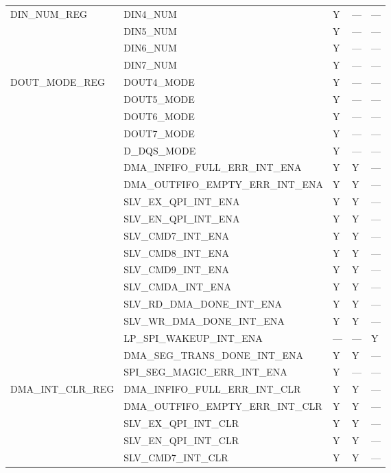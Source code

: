\documentclass[main\_\_CN.tex]{subfiles}
\begin{document}
\begin{longtable}{|p{4.0cm}|p{6.0cm}|p{1.5cm}|p{1.5cm}|p{1.5cm}|}
\multirow{4}{*}{DIN\_NUM\_REG} & DIN4\_NUM & Y & --- & --- \\ \cline{2-5}
& DIN5\_NUM & Y & --- & --- \\ \cline{2-5}
& DIN6\_NUM & Y & --- & --- \\ \cline{2-5}
& DIN7\_NUM & Y & --- & --- \\ \hline
\multirow{5}{*}{DOUT\_MODE\_REG} & DOUT4\_MODE & Y & --- & --- \\ \cline{2-5}
& DOUT5\_MODE & Y & --- & --- \\ \cline{2-5}
& DOUT6\_MODE & Y & --- & --- \\ \cline{2-5}
& DOUT7\_MODE & Y & --- & --- \\ \cline{2-5}
& D\_DQS\_MODE & Y & --- & --- \\ \hline
\clearpage
\multirow{13}{*}{DMA\_INT\_ENA\_REG} & DMA\_INFIFO\_FULL\_ERR\_INT\_ENA & Y & Y & --- \\ \cline{2-5}
& DMA\_OUTFIFO\_EMPTY\_ERR\_INT\_ENA & Y & Y & --- \\ \cline{2-5}
& SLV\_EX\_QPI\_INT\_ENA & Y & Y & --- \\ \cline{2-5}
& SLV\_EN\_QPI\_INT\_ENA & Y & Y & --- \\ \cline{2-5}
& SLV\_CMD7\_INT\_ENA & Y & Y & --- \\ \cline{2-5}
& SLV\_CMD8\_INT\_ENA & Y & Y & --- \\ \cline{2-5}
& SLV\_CMD9\_INT\_ENA & Y & Y & --- \\ \cline{2-5}
& SLV\_CMDA\_INT\_ENA & Y & Y & --- \\ \cline{2-5}
& SLV\_RD\_DMA\_DONE\_INT\_ENA & Y & Y & --- \\ \cline{2-5}
& SLV\_WR\_DMA\_DONE\_INT\_ENA & Y & Y & --- \\ \cline{2-5}
& LP\_SPI\_WAKEUP\_INT\_ENA & --- & --- & Y \\ \cline{2-5}
& DMA\_SEG\_TRANS\_DONE\_INT\_ENA & Y & Y & --- \\ \cline{2-5}
& SPI\_SEG\_MAGIC\_ERR\_INT\_ENA & Y & --- & --- \\ \hline
\multirow{13}{*}{DMA\_INT\_CLR\_REG} & DMA\_INFIFO\_FULL\_ERR\_INT\_CLR & Y & Y & --- \\ \cline{2-5}
& DMA\_OUTFIFO\_EMPTY\_ERR\_INT\_CLR & Y & Y & --- \\ \cline{2-5}
& SLV\_EX\_QPI\_INT\_CLR & Y & Y & --- \\ \cline{2-5}
& SLV\_EN\_QPI\_INT\_CLR & Y & Y & --- \\ \cline{2-5}
& SLV\_CMD7\_INT\_CLR & Y & Y & --- \\ \cline{2-5}

\end{longtable}
\end{document}
